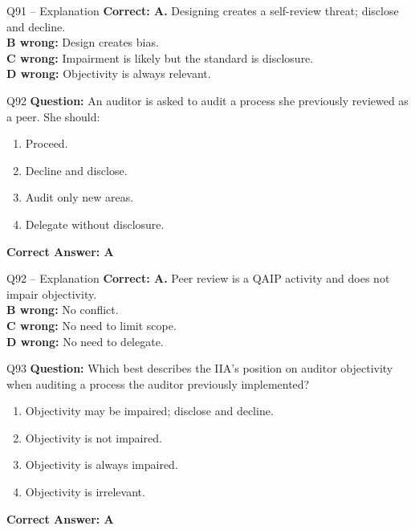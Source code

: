 \documentclass[aspectratio=169,10pt]{beamer}
\begin{document}
	\begin{frame}[t]{Q91 -- Explanation}
		\small
		\textbf{Correct: A.} Designing creates a self-review threat; disclose and decline. \\[4pt]
		\textbf{B wrong:} Design creates bias. \\[2pt]
		\textbf{C wrong:} Impairment is likely but the standard is disclosure. \\[2pt]
		\textbf{D wrong:} Objectivity is always relevant.
	\end{frame}
	
	\begin{frame}[t]{Q92}
		\small
		\textbf{Question:} An auditor is asked to audit a process she previously reviewed as a peer. She should:
		\begin{enumerate}[label=\Alph*.,itemsep=1pt,topsep=2pt]
			\item Proceed.
			\item Decline and disclose.
			\item Audit only new areas.
			\item Delegate without disclosure.
		\end{enumerate}
		\vspace{4pt}
		\textbf{Correct Answer: A}
	\end{frame}
	
	\begin{frame}[t]{Q92 -- Explanation}
		\small
		\textbf{Correct: A.} Peer review is a QAIP activity and does not impair objectivity. \\[4pt]
		\textbf{B wrong:} No conflict. \\[2pt]
		\textbf{C wrong:} No need to limit scope. \\[2pt]
		\textbf{D wrong:} No need to delegate.
	\end{frame}
	
	\begin{frame}[t]{Q93}
		\small
		\textbf{Question:} Which best describes the IIA's position on auditor objectivity when auditing a process the auditor previously implemented?
		\begin{enumerate}[label=\Alph*.,itemsep=1pt,topsep=2pt]
			\item Objectivity may be impaired; disclose and decline.
			\item Objectivity is not impaired.
			\item Objectivity is always impaired.
			\item Objectivity is irrelevant.
		\end{enumerate}
		\vspace{4pt}
		\textbf{Correct Answer: A}
	\end{frame}
	
\end{document}
